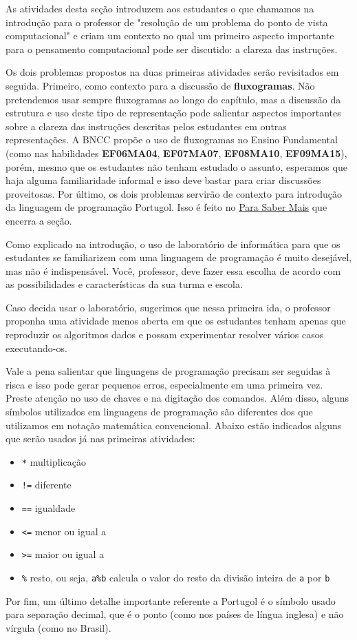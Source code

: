 \def\currentcolor{session1}
\begin{texto}
{
As atividades desta seção introduzem aos estudantes o que chamamos na introdução para o professor de "resolução de um problema do ponto de vista computacional"{} e criam um contexto no qual um primeiro aspecto importante para o pensamento computacional pode ser discutido: a clareza das instruções.

Os dois problemas propostos na duas primeiras atividades serão revisitados em seguida. Primeiro, como contexto para a discussão de \textbf{fluxogramas}. Não pretendemos usar sempre fluxogramas ao longo do capítulo, mas a discussão da estrutura e uso deste tipo de representação pode salientar aspectos importantes sobre a clareza das instruções descritas pelos estudantes em outras representações. A BNCC propõe o uso de fluxogramas no Ensino Fundamental (como nas habilidades \textbf{EF06MA04}, \textbf{EF07MA07}, \textbf{EF08MA10}, \textbf{EF09MA15}), porém, mesmo que os estudantes não tenham estudado o assunto, esperamos que haja alguma familiaridade informal e isso deve bastar para criar discussões proveitosas. Por último, os dois problemas servirão de contexto para introdução da linguagem de programação Portugol. Isso é feito no \hyperref[comp-know1]{Para Saber Mais} que encerra a seção.

Como explicado na introdução, o uso de laboratório de informática para que os estudantes se familiarizem com uma linguagem de programação é muito desejável, mas não é indispensável. Você, professor, deve fazer essa escolha de acordo com as possibilidades e características da sua turma e escola.

Caso decida usar o laboratório, sugerimos que nessa primeira ida, o professor proponha uma atividade menos aberta em que os estudantes tenham apenas que reproduzir os algoritmos dados e possam experimentar resolver vários casos executando-os.

Vale a pena salientar que linguagens de programação precisam ser seguidas à risca e isso pode gerar pequenos erros, especialmente em uma primeira vez. Preste atenção no uso de chaves e na digitação dos comandos. Além disso, alguns símbolos utilizados em linguagens de programação são diferentes dos que utilizamos em notação matemática convencional. Abaixo estão indicados alguns que serão usados já nas primeiras atividades:

\begin{itemize}
\item \texttt{*} multiplicação
\item \texttt{!=} diferente
\item \texttt{==} igualdade
\item \texttt{<=} menor ou igual a
\item \texttt{>=} maior ou igual a
\item \texttt{\%} resto, ou seja, \texttt{a\%b} calcula o valor do resto da divisão inteira de \texttt{a} por \texttt{b}
\end{itemize}

Por fim, um último detalhe importante referente a Portugol é o símbolo usado para separação decimal, que é o ponto (como nos países de língua inglesa) e não vírgula (como no Brasil).
}
\end{texto}
